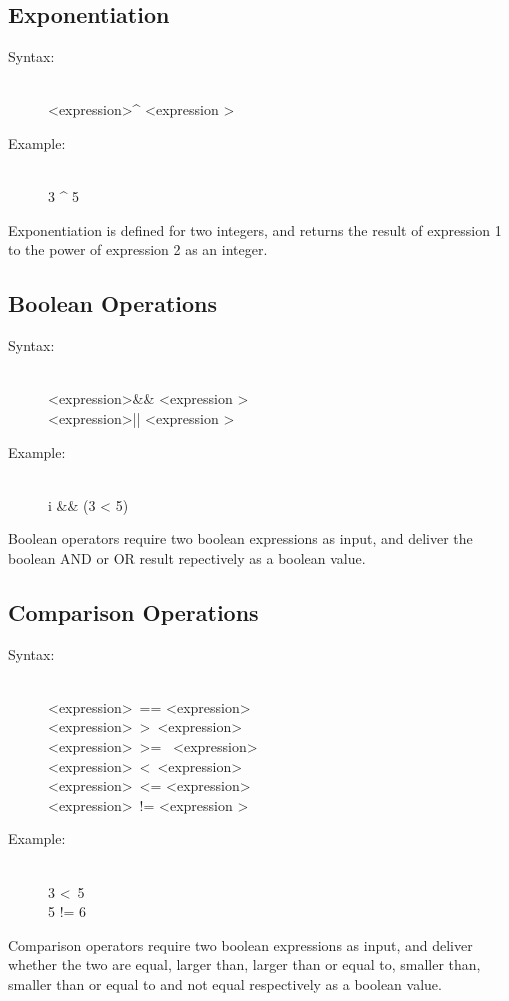 \documentclass[10pt,a4paper]{report}
\begin{document}
\subsection{Exponentiation}
\begin{description}
	\item[Syntax:] \hfill \\ 
		\textless expression\textgreater \^{} \textless expression \textgreater
	\item[Example:] \hfill \\
		3 \^{} 5
\end{description}
Exponentiation is defined for two integers, and returns the result of expression 1 to the power of expression 2 as an integer.

\subsection{Boolean Operations}
\begin{description}
	\item[Syntax:] \hfill \\ 
		\textless expression\textgreater \&\& \textless expression \textgreater \\
		\textless expression\textgreater || \textless expression \textgreater
	\item[Example:] \hfill \\
		i \&\& (3 < 5)
\end{description}
Boolean operators require two boolean expressions as input, and deliver the boolean AND or OR result repectively as a boolean value.

\subsection{Comparison Operations}
\begin{description}
	\item[Syntax:] \hfill \\ 
		\textless expression\textgreater ~== \textless expression\textgreater \\
		\textless expression\textgreater ~\textgreater ~\textless expression\textgreater \\
		\textless expression\textgreater ~\textgreater = ~\textless expression\textgreater \\
		\textless expression\textgreater ~\textless ~\textless expression\textgreater \\
		\textless expression\textgreater ~\textless = \textless expression\textgreater \\
		\textless expression\textgreater ~!= \textless expression \textgreater
	\item[Example:] \hfill \\
		3 \textless ~5 \\
		5 != 6
		
\end{description}
Comparison operators require two boolean expressions as input, and deliver whether the two are equal, larger than, larger than or equal to, smaller than, smaller than or equal to and not equal respectively as a boolean value.
\end{document}

